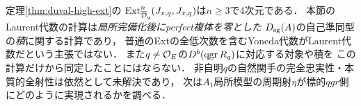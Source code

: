 \begin{remark}
定理\ref{thm:duval-high-ext}の
$\operatorname{Ext}^n_{\overline{\mathcal D}_q}(J_{x,q},J_{x,q})$は$n\ge3$で4次元である．
本節のLaurent代数の計算は\emph{局所完備化後にperfect複体を零とした}
$D_{\rm sg}(A)$の自己準同型の\emph{積}に関する計算であり，
普通のExtの全低次数を含むYoneda代数がLaurent代数だという主張ではない．
また$q\ne\mathcal O_E$の$D^b(\operatorname{qgr} R_q)$に対応する対象や積を
この計算だけから同定したことにはならない．
非自明$q$の自然関手の完全忠実性・本質的全射性は依然として未解決であり，
次は$A_1$局所模型の周期射$\eta$が標的$qgr$側にどのように実現されるかを調べる．
\end{remark}
